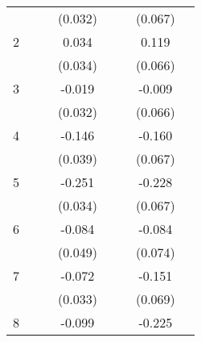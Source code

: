{\begin{longtable}{l*{3}{c}|l*{3}{c}}
		&                     &                     &     (0.032)         &                     &                     &     (0.067)         \\
		2                   &                     &                     &       0.034         &                     &                     &       0.119         \\
		&                     &                     &     (0.034)         &                     &                     &     (0.066)         \\
		3                   &                     &                     &      -0.019         &                     &                     &      -0.009         \\
		&                     &                     &     (0.032)         &                     &                     &     (0.066)         \\
		4                   &                     &                     &      -0.146\sym{***}&                     &                     &      -0.160\sym{*}  \\
		&                     &                     &     (0.039)         &                     &                     &     (0.067)         \\
		5                   &                     &                     &      -0.251\sym{***}&                     &                     &      -0.228\sym{***}\\
		&                     &                     &     (0.034)         &                     &                     &     (0.067)         \\
		6                   &                     &                     &      -0.084         &                     &                     &      -0.084         \\
		&                     &                     &     (0.049)         &                     &                     &     (0.074)         \\
		7                   &                     &                     &      -0.072\sym{*}  &                     &                     &      -0.151\sym{*}  \\
		&                     &                     &     (0.033)         &                     &                     &     (0.069)         \\
		8                   &                     &                     &      -0.099\sym{**} &                     &                     &      -0.225\sym{***}\\

\end{longtable}}
